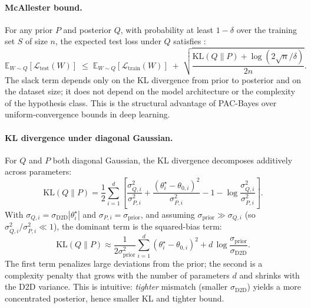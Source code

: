\paragraph{McAllester bound.} For any prior $P$ and posterior $Q$, with probability at least $1-\delta$ over the training set $S$ of size $n$, the expected test loss under $Q$ satisfies \citep{mcallester1999some}:
\begin{equation}
    \mathbb{E}_{W\sim Q}[\mathcal{L}_{\text{test}}(W)]
    \;\leq\;
    \mathbb{E}_{W\sim Q}[\mathcal{L}_{\text{train}}(W)]
    \;+\;
    \sqrt{\frac{\mathrm{KL}(Q\|P) + \log(2\sqrt{n}/\delta)}{2n}}.
    \label{eq:mcallester-bound}
\end{equation}
The slack term depends only on the KL divergence from prior to posterior and on the dataset size; it does not depend on the model architecture or the complexity of the hypothesis class. This is the structural advantage of PAC-Bayes over uniform-convergence bounds in deep learning.

\paragraph{KL divergence under diagonal Gaussian.} For $Q$ and $P$ both diagonal Gaussian, the KL divergence decomposes additively across parameters:
\begin{equation}
    \mathrm{KL}(Q\|P)
    = \frac{1}{2}\sum_{i=1}^{d}\!
    \left[
        \frac{\sigma_{Q,i}^2}{\sigma_{P,i}^2}
        + \frac{(\theta^{\star}_i - \theta_{0,i})^2}{\sigma_{P,i}^2}
        - 1
        - \log\frac{\sigma_{Q,i}^2}{\sigma_{P,i}^2}
    \right].
    \label{eq:kl-diagonal}
\end{equation}
With $\sigma_{Q,i}=\sigma_{\text{D2D}}|\theta^{\star}_i|$ and $\sigma_{P,i}=\sigma_{\text{prior}}$, and assuming $\sigma_{\text{prior}}\gg\sigma_{Q,i}$ (so $\sigma_{Q,i}^2/\sigma_{P,i}^2\ll 1$), the dominant term is the squared-bias term:
\begin{equation}
    \mathrm{KL}(Q\|P)
    \approx
    \frac{1}{2\sigma_{\text{prior}}^2}\sum_{i=1}^{d}(\theta^{\star}_i - \theta_{0,i})^2
    + d\,\log\frac{\sigma_{\text{prior}}}{\sigma_{\text{D2D}}}.
    \label{eq:kl-approx}
\end{equation}
The first term penalizes large deviations from the prior; the second is a complexity penalty that grows with the number of parameters $d$ and shrinks with the D2D variance. This is intuitive: \emph{tighter} mismatch (smaller $\sigma_{\text{D2D}}$) yields a more concentrated posterior, hence smaller KL and tighter bound.


